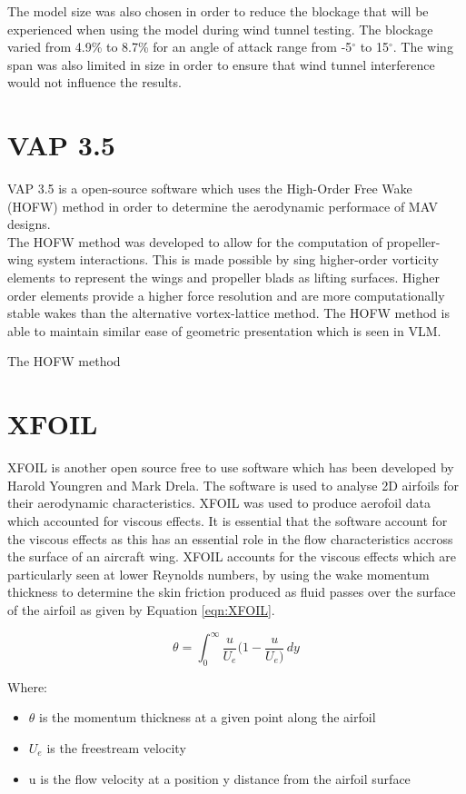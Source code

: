 The model size was also chosen in order to reduce the blockage that will be experienced when using the model during wind tunnel testing. The blockage varied from 4.9\% to 8.7\% for an angle of attack range from -5$^\circ$ to 15$^\circ$. The wing span was also limited in size in order to ensure that wind tunnel interference would not influence the results. 

\section{VAP 3.5}
VAP 3.5 is a open-source software which uses the High-Order Free Wake (HOFW)  method in order to determine the aerodynamic performace of MAV designs. \\

The HOFW method was developed to allow for the computation of propeller-wing system interactions. This is made possible by sing higher-order vorticity elements to represent the wings and propeller blads as lifting surfaces. Higher order elements provide a higher force resolution and are more computationally stable wakes than the alternative vortex-lattice method. The HOFW method is able to maintain similar ease of geometric presentation which is seen in VLM. 

The HOFW method


\section{XFOIL}
XFOIL is another open source free to use software which has been developed by Harold Youngren and Mark Drela. The software is used to analyse 2D airfoils for their aerodynamic characteristics. XFOIL was used to produce aerofoil data which accounted for viscous effects. It is essential that the software account for the viscous effects as this has an essential role in the flow characteristics accross the surface of an aircraft wing. XFOIL accounts for the viscous effects which are particularly seen at lower Reynolds numbers, by using the wake momentum thickness to determine the skin friction produced as fluid passes over the surface of the airfoil as given by Equation \ref{eqn:XFOIL}. 


\begin{equation}
    \theta = \int_{0}^{\infty} \frac{u}{U_e} ( 1 - \frac{u}{U_e) } \,dy
    \label{eqn:XFOIL}
\end{equation}

Where:
\begin{itemize}
    \item $\theta$ is the momentum thickness at a given point along the airfoil
    \item $U_e$ is the freestream velocity 
    \item u is the flow velocity at a position y distance from the airfoil surface
\end{itemize}

